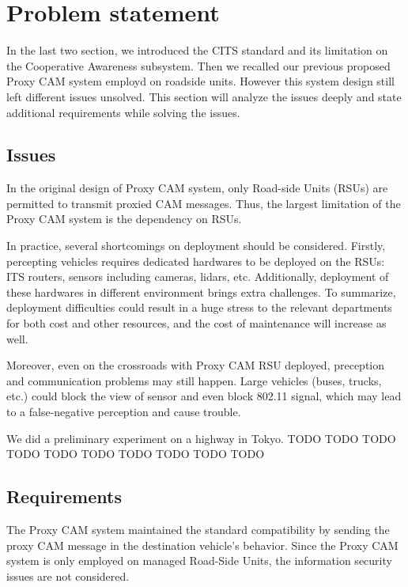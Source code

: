 \newpage

\section{Problem statement} \label{sec:problem}
In the last two section, we introduced the CITS standard and its limitation on the Cooperative Awareness subsystem.
Then we recalled our previous proposed Proxy CAM system employd on roadside units.
However this system design still left different issues unsolved.
This section will analyze the issues deeply and state additional requirements while solving the issues.

\subsection{Issues}
In the original design of Proxy CAM system, only Road-side Units (RSUs) are permitted to transmit proxied CAM messages.
Thus, the largest limitation of the Proxy CAM system is the dependency on RSUs.

In practice, several shortcomings on deployment should be considered.
Firstly, percepting vehicles requires dedicated hardwares to be deployed on the RSUs: ITS routers, sensors including cameras, lidars, etc.
Additionally, deployment of these hardwares in different environment brings extra challenges.
To summarize, deployment difficulties could result in a huge stress to the relevant departments for both cost and other resources, and the cost of maintenance will increase as well.

Moreover, even on the crossroads with Proxy CAM RSU deployed, preception and communication problems may still happen.
Large vehicles (buses, trucks, etc.) could block the view of sensor and even block 802.11 signal, which may lead to a false-negative perception and cause trouble.

We did a preliminary experiment on a highway in Tokyo.
TODO TODO TODO TODO TODO TODO TODO TODO TODO TODO


\subsection{Requirements}
The Proxy CAM system maintained the standard compatibility by sending the proxy CAM message in the destination vehicle's behavior.
Since the Proxy CAM system is only employed on managed Road-Side Units, the information security issues are not considered.

